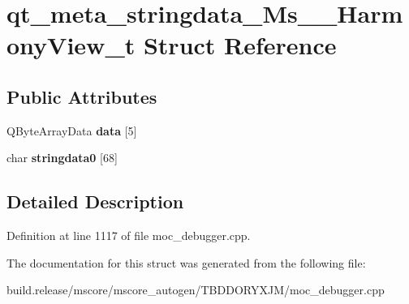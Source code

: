 \hypertarget{structqt__meta__stringdata___ms_____harmony_view__t}{}\section{qt\+\_\+meta\+\_\+stringdata\+\_\+\+Ms\+\_\+\+\_\+\+Harmony\+View\+\_\+t Struct Reference}
\label{structqt__meta__stringdata___ms_____harmony_view__t}
\subsection*{Public Attributes}
\begin{DoxyCompactItemize}
\item 
\mbox{\label{structqt__meta__stringdata___ms_____harmony_view__t_a0823e3e2b1ae2afa6955736a077be956}} 
Q\+Byte\+Array\+Data {\bfseries data} \mbox{[}5\mbox{]}
\item 
\mbox{\label{structqt__meta__stringdata___ms_____harmony_view__t_af095947760d80597b3e2cfefaaec5c06}} 
char {\bfseries stringdata0} \mbox{[}68\mbox{]}
\end{DoxyCompactItemize}


\subsection{Detailed Description}


Definition at line 1117 of file moc\+\_\+debugger.\+cpp.



The documentation for this struct was generated from the following file\+:\begin{DoxyCompactItemize}
\item 
build.\+release/mscore/mscore\+\_\+autogen/\+T\+B\+D\+D\+O\+R\+Y\+X\+J\+M/moc\+\_\+debugger.\+cpp\end{DoxyCompactItemize}
